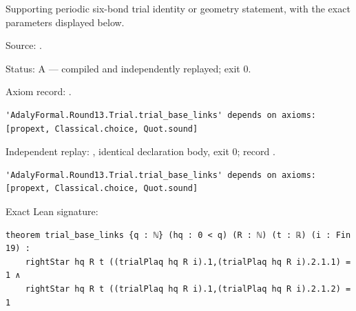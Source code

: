 \begin{theorem}[bp-408]
\label{bp-408}
\leanok
Supporting periodic six-bond trial identity or geometry statement, with the exact parameters displayed below.

\par Source: \texttt{}.
\par Status: A — compiled and independently replayed; exit 0.
\par Axiom record: \texttt{}.
\begin{verbatim}
'AdalyFormal.Round13.Trial.trial_base_links' depends on axioms: [propext, Classical.choice, Quot.sound]
\end{verbatim}
\par Independent replay: \texttt{}, identical declaration body, exit 0; record \texttt{}.
\begin{verbatim}
'AdalyFormal.Round13.Trial.trial_base_links' depends on axioms: [propext, Classical.choice, Quot.sound]
\end{verbatim}
\par Exact Lean signature:
\begin{verbatim}
theorem trial_base_links {q : ℕ} (hq : 0 < q) (R : ℕ) (t : ℝ) (i : Fin 19) :
    rightStar hq R t ((trialPlaq hq R i).1,(trialPlaq hq R i).2.1.1) = 1 ∧
    rightStar hq R t ((trialPlaq hq R i).1,(trialPlaq hq R i).2.1.2) = 1
\end{verbatim}
\end{theorem}

